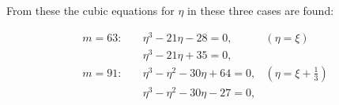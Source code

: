 From these the cubic equations for $\eta$ in these three cases are found:

\[ \begin{aligned}
m = 63:\quad &\eta^3 - 21\eta - 28 = 0, & (\eta = \xi) \\
&\eta^3 - 21\eta + 35 = 0, \\
m = 91:\quad &\eta^3 - \eta^2 - 30\eta + 64 = 0, & (\eta = \xi + \tfrac{1}{3}) \\
&\eta^3 - \eta^2 - 30\eta - 27 = 0,
\end{aligned} \]
